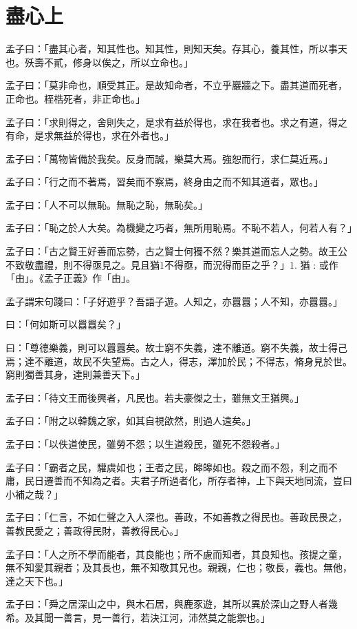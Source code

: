 \documentclass[12pt,a4paper]{ctexbook}
\begin{document}
\section{盡心上}
孟子曰：「盡其心者，知其性也。知其性，則知天矣。存其心，養其性，所以事天也。殀壽不貳，修身以俟之，所以立命也。」\par
孟子曰：「莫非命也，順受其正。是故知命者，不立乎巖牆之下。盡其道而死者，正命也。桎梏死者，非正命也。」\par
孟子曰：「求則得之，舍則失之，是求有益於得也，求在我者也。求之有道，得之有命，是求無益於得也，求在外者也。」\par
孟子曰：「萬物皆備於我矣。反身而誠，樂莫大焉。強恕而行，求仁莫近焉。」\par
孟子曰：「行之而不著焉，習矣而不察焉，終身由之而不知其道者，眾也。」\par
孟子曰：「人不可以無恥。無恥之恥，無恥矣。」\par
孟子曰：「恥之於人大矣。為機變之巧者，無所用恥焉。不恥不若人，何若人有？」\par
孟子曰：「古之賢王好善而忘勢，古之賢士何獨不然？樂其道而忘人之勢。故王公不致敬盡禮，則不得亟見之。見且猶1不得亟，而況得而臣之乎？」1. 猶 : 或作「由」。《孟子正義》作「由」。\par
孟子謂宋句踐曰：「子好遊乎？吾語子遊。人知之，亦囂囂；人不知，亦囂囂。」\par
曰：「何如斯可以囂囂矣？」\par
曰：「尊德樂義，則可以囂囂矣。故士窮不失義，達不離道。窮不失義，故士得己焉；達不離道，故民不失望焉。古之人，得志，澤加於民；不得志，脩身見於世。窮則獨善其身，達則兼善天下。」\par
孟子曰：「待文王而後興者，凡民也。若夫豪傑之士，雖無文王猶興。」\par
孟子曰：「附之以韓魏之家，如其自視欿然，則過人遠矣。」\par
孟子曰：「以佚道使民，雖勞不怨；以生道殺民，雖死不怨殺者。」\par
孟子曰：「霸者之民，驩虞如也；王者之民，皞皞如也。殺之而不怨，利之而不庸，民日遷善而不知為之者。夫君子所過者化，所存者神，上下與天地同流，豈曰小補之哉？」\par
孟子曰：「仁言，不如仁聲之入人深也。善政，不如善教之得民也。善政民畏之，善教民愛之；善政得民財，善教得民心。」\par
孟子曰：「人之所不學而能者，其良能也；所不慮而知者，其良知也。孩提之童，無不知愛其親者；及其長也，無不知敬其兄也。親親，仁也；敬長，義也。無他，達之天下也。」\par
孟子曰：「舜之居深山之中，與木石居，與鹿豕遊，其所以異於深山之野人者幾希。及其聞一善言，見一善行，若決江河，沛然莫之能禦也。」\par
\end{document}
